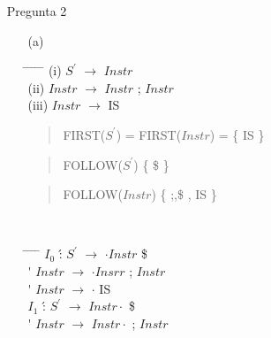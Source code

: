 \documentclass{article}
\begin{document}
\begin{enumerate}
\begin{enumerate}
					
					\end{enumerate}
				\large \bf \item[] Pregunta 2
				\normalsize \mdseries
					\begin{enumerate}
					\item[(a)]								
					\begin{tabbing}
								\hspace*{1cm} \= \hspace*{1cm} \= \hspace*{1cm} \= \hspace*{0.6cm} \= \hspace*{0.6cm} \= \hspace*{3cm} \kill
									\> (i)\>  $S^{\prime}$	\> $\longrightarrow$\> 	$Instr$ 	\\
									\> (ii)\>  $Instr$	\> $\longrightarrow$\> 	$Instr$ ; $Instr$ 	\\
									\> (iii)\>  $Instr$	\> $\longrightarrow$\>  IS 	\\
					\end{tabbing}
					\begin{quotation}
						FIRST($S^{\prime}$) =  FIRST($Instr$) = \{ IS \}
					\end{quotation}		
					\begin{quotation}
						FOLLOW($S^{\prime}$) \{ \$ \}
					\end{quotation}
					\begin{quotation}
						FOLLOW($Instr$) \{ ;,\$ , IS \}
					\end{quotation}						
					\ \ 
					\begin{tabbing}
					 \hspace*{1cm} \= \hspace*{1cm} \= \hspace*{0.8cm} \= \hspace*{0.6cm} \= \hspace*{3cm} \kill
						\> $I_{0}$	\' : 	\> $S^{\prime}$		\> $\longrightarrow$\> 	$\cdot Instr$ \$	\\
						\>			\'  	\> $Instr$ 			\> $\longrightarrow$\> 	$\cdot Insrr$ ; $Instr$	\\
						\>			\'  	\> $Instr$ 			\> $\longrightarrow$\> 	$\cdot$ IS	\\


						\> $I_{1}$	\' : 	\> $S^{\prime}$		\> $\longrightarrow$\> 	$Instr \cdot$ \$	\\
						\>			\'  	\> $Instr$ 			\> $\longrightarrow$\> 	$Instr \cdot$ ; $Instr$	\\


\end{tabbing}
\end{enumerate}
\end{enumerate}
\end{document}
